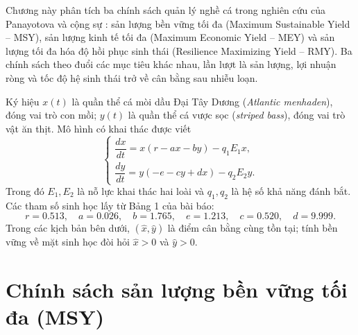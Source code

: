 
Chương này phân tích ba chính sách quản lý nghề cá trong nghiên cứu của Panayotova và cộng sự \cite{panayotova2023bioeconomic}: sản lượng bền vững tối đa (Maximum Sustainable Yield -- MSY), sản lượng kinh tế tối đa (Maximum Economic Yield -- MEY) và sản lượng tối đa hóa độ hồi phục sinh thái (Resilience Maximizing Yield -- RMY). Ba chính sách theo đuổi các mục tiêu khác nhau, lần lượt là sản lượng, lợi nhuận ròng và tốc độ hệ sinh thái trở về cân bằng sau nhiễu loạn.

Ký hiệu \(x(t)\) là quần thể cá mòi dầu Đại Tây Dương (\textit{Atlantic menhaden}), đóng vai trò con mồi; \(y(t)\) là quần thể cá vược sọc (\textit{striped bass}), đóng vai trò vật ăn thịt. Mô hình có khai thác được viết
\begin{equation}
\label{eq:policy_model}
\begin{cases}
\dfrac{dx}{dt}=x(r-ax-by)-q_1E_1x,\\[0.4em]
\dfrac{dy}{dt}=y(-e-cy+dx)-q_2E_2y.
\end{cases}
\end{equation}
Trong đó \(E_1,E_2\) là nỗ lực khai thác hai loài và \(q_1,q_2\) là hệ số khả năng đánh bắt. Các tham số sinh học lấy từ Bảng 1 của bài báo:
\[
r=0.513,\quad a=0.026,\quad b=1.765,\quad
e=1.213,\quad c=0.520,\quad d=9.999.
\]
Trong các kịch bản bên dưới, \((\hat{x},\hat{y})\) là điểm cân bằng cùng tồn tại; tính bền vững về mặt sinh học đòi hỏi \(\hat{x}>0\) và \(\hat{y}>0\).

\section{Chính sách sản lượng bền vững tối đa (MSY)}
\label{sec:msy}

